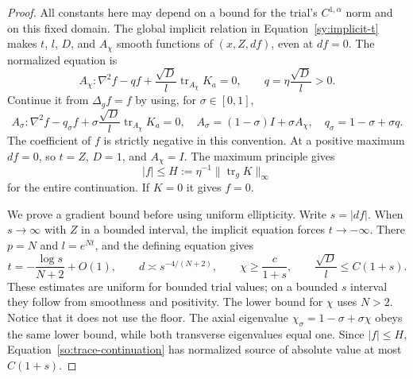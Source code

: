 \begin{proof}
All constants here may depend on a bound for the trial's
$C^{1,\alpha}$ norm and on this fixed domain.  The global implicit
relation in Equation~\ref{sy:implicit-t} makes $t$, $l$, $D$, and
$A_\chi$ smooth functions of $(x,Z,df)$, even at $df=0$.
The normalized equation is
\[
 A_\chi:\nabla^2f-qf+\frac{\sqrt D}{l}
                           \operatorname{tr}_{A_\chi}K_a=0,
 \qquad q=\eta\frac{\sqrt D}{l}>0.
\]
Continue it from $\Delta_gf=f$ by using, for $\sigma\in[0,1]$,
\begin{equation}\label{so:trace-continuation}
 A_\sigma:\nabla^2f-q_\sigma f
       +\sigma\frac{\sqrt D}{l}
                             \operatorname{tr}_{A_\chi}K_a=0,
 \quad
 A_\sigma=(1-\sigma)I+\sigma A_\chi,
 \quad q_\sigma=1-\sigma+\sigma q.
\end{equation}
The coefficient of $f$ is strictly negative in this convention.
At a positive maximum $df=0$, so $t=Z$, $D=1$, and $A_\chi=I$.
The maximum principle gives
\[
 |f|\le H:=\eta^{-1}\|\operatorname{tr}_gK\|_\infty
\]
for the entire continuation.  If $K=0$ it gives $f=0$.

We prove a gradient bound before using uniform ellipticity.  Write
$s=|df|$.  When $s\to\infty$ with $Z$ in a bounded interval, the
implicit equation forces $t\to-\infty$.  There $p=N$ and $l=e^{Nt}$,
and the defining equation gives
\begin{equation}\label{so:large-trial-slope}
 t=-\frac{\log s}{N+2}+O(1),\qquad
 d\asymp s^{-4/(N+2)},\qquad
 \chi\ge\frac{c}{1+s},\qquad
 \frac{\sqrt D}{l}\le C(1+s).
\end{equation}
These estimates are uniform for bounded trial values; on a bounded
$s$ interval they follow from smoothness and positivity.  The lower
bound for $\chi$ uses $N>2$.  Notice that it does not use the floor.
The axial eigenvalue $\chi_\sigma=1-\sigma+\sigma\chi$ obeys the
same lower bound, while both transverse eigenvalues equal one.
Since $|f|\le H$, Equation~\ref{so:trace-continuation} has normalized
source of absolute value at most $C(1+s)$.


\end{proof}
